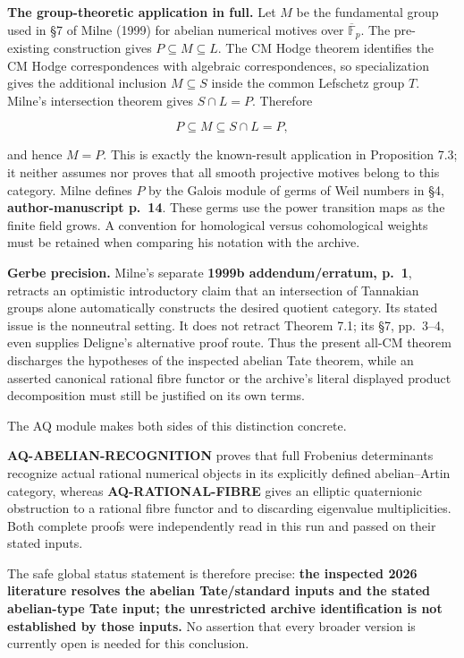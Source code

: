 \textbf{The group-theoretic application in full.} Let \(M\) be the
fundamental group used in §7 of Milne (1999) for abelian numerical
motives over \(\overline{\mathbb F}_p\). The pre-existing construction
gives \(P\subseteq M\subseteq L\). The CM Hodge theorem identifies the
CM Hodge correspondences with algebraic correspondences, so
specialization gives the additional inclusion \(M\subseteq S\) inside
the common Lefschetz group \(T\). Milne's intersection theorem gives
\(S\cap L=P\). Therefore

\[
P\subseteq M\subseteq S\cap L=P,
\]

and hence \(M=P\). This is exactly the known-result application in
Proposition 7.3; it neither assumes nor proves that all smooth
projective motives belong to this category. Milne defines \(P\) by the
Galois module of germs of Weil numbers in §4, \textbf{author-manuscript
p.~14}. These germs use the power transition maps as the finite field
grows. A convention for homological versus cohomological weights must be
retained when comparing his notation with the archive.

\textbf{Gerbe precision.} Milne's separate \textbf{1999b
addendum/erratum, p.~1}, retracts an optimistic introductory claim that
an intersection of Tannakian groups alone automatically constructs the
desired quotient category. Its stated issue is the nonneutral setting.
It does not retract Theorem 7.1; its §7, pp.~3--4, even supplies
Deligne's alternative proof route. Thus the present all-CM theorem
discharges the hypotheses of the inspected abelian Tate theorem, while
an asserted canonical rational fibre functor or the archive's literal
displayed product decomposition must still be justified on its own
terms.

The AQ module makes both sides of this distinction concrete.

\textbf{AQ-ABELIAN-RECOGNITION} proves that full Frobenius determinants
recognize actual rational numerical objects in its explicitly defined
abelian--Artin category, whereas \textbf{AQ-RATIONAL-FIBRE} gives an
elliptic quaternionic obstruction to a rational fibre functor and to
discarding eigenvalue multiplicities. Both complete proofs were
independently read in this run and passed on their stated inputs.

The safe global status statement is therefore precise: \textbf{the
inspected 2026 literature resolves the abelian Tate/standard inputs and
the stated abelian-type Tate input; the unrestricted archive
identification is not established by those inputs.} No assertion that
every broader version is currently open is needed for this conclusion.

